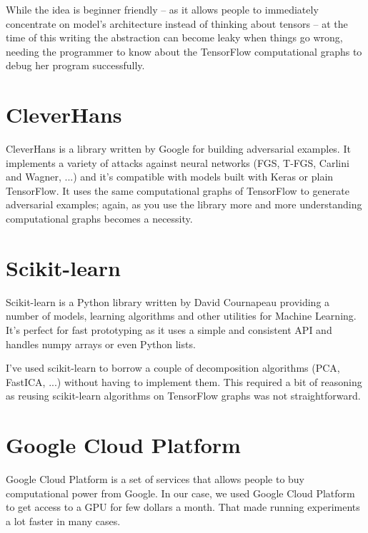 While the idea is beginner friendly -- as it allows people
to immediately concentrate on model's architecture instead
of thinking about tensors -- at the time of this writing the
abstraction can become leaky when things go wrong, needing
the programmer to know about the TensorFlow computational
graphs to debug her program successfully.

\section{CleverHans}
\label{sec:cleverhans}

CleverHans is a library written by Google for building
adversarial examples. It implements a variety of attacks
against neural networks (FGS, T-FGS, Carlini and Wagner,
...) and it's compatible with models built with Keras or
plain TensorFlow. It uses the same computational graphs of
TensorFlow to generate adversarial examples; again, as you
use the library more and more understanding computational
graphs becomes a necessity.

\section{Scikit-learn}
\label{sec:sklearn}

Scikit-learn is a Python library written by David Cournapeau
providing a number of models, learning algorithms and other
utilities for Machine Learning. It's perfect for fast
prototyping as it uses a simple and consistent API and
handles numpy arrays or even Python lists.

I've used scikit-learn to borrow a couple of decomposition
algorithms (PCA, FastICA, ...) without having to implement
them. This required a bit of reasoning as reusing
scikit-learn algorithms on TensorFlow graphs was not
straightforward.

\section{Google Cloud Platform}
\label{sec:google-cloud-platform}

Google Cloud Platform is a set of services that allows
people to buy computational power from Google. In our case,
we used Google Cloud Platform to get access to a GPU for few
dollars a month. That made running experiments a lot faster
in many cases.
